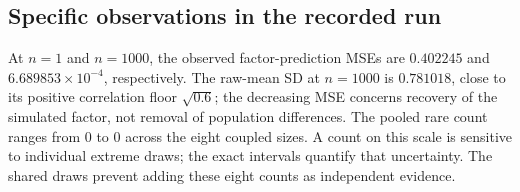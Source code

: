 \subsection{Specific observations in the recorded run}
At $n=1$ and $n=1000$, the observed factor-prediction MSEs are $0.402245$ and $6.689853\times10^{-4}$, respectively. The raw-mean SD at $n=1000$ is $0.781018$, close to its positive correlation floor $\sqrt{0.6}$; the decreasing MSE concerns recovery of the simulated factor, not removal of population differences. The pooled rare count ranges from 0 to 0 across the eight coupled sizes. A count on this scale is sensitive to individual extreme draws; the exact intervals quantify that uncertainty. The shared draws prevent adding these eight counts as independent evidence.
